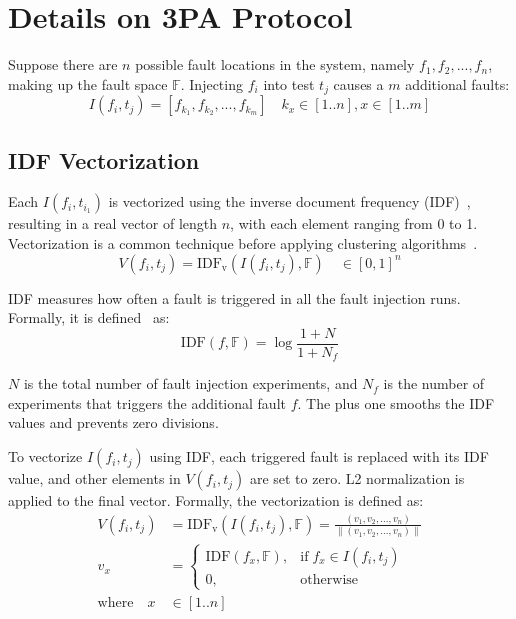 \appendix

\section{Details on 3PA Protocol}
\label{app:3pa}

Suppose there are $n$ possible fault locations in the system, namely $f_1, f_2, ..., f_n$, making up the fault space $\mathbb F$. Injecting $f_i$ into test $t_j$ causes a $m$ additional faults: 
\begin{equation} 
I(f_i, t_j)=[f_{{k_1}}, f_{{k_2}}, ..., f_{{k_m}}]\quad k_x\in[1..n], x \in [1..m]
\end{equation}

\subsection{IDF Vectorization}
\label{app:3pa:idf}

Each $I(f_i, t_{i_1})$ is vectorized using the inverse document frequency (IDF)~\cite{schutze2008introduction}, resulting in a real vector of length $n$, with each element ranging from 0 to 1. Vectorization is a common technique before applying clustering algorithms~\cite{schutze2008introduction}.
\begin{equation}
V(f_i, t_j)=\mathrm{IDF_v}(I(f_i, t_j), \mathbb{F}) \quad \in [0,1]^n
\end{equation}

IDF measures how often a fault is triggered in all the fault injection runs. Formally, it is defined~\cite{schutze2008introduction} as:
\begin{equation}
\mathrm{IDF}(f, \mathbb F) = \log \frac{1 + N}{1 + N_f}
\end{equation}

$N$ is the total number of fault injection experiments, and $N_f$ is the number of experiments that triggers the additional fault $f$. The plus one smooths the IDF values and prevents zero divisions.

To vectorize $I(f_i, t_j)$ using IDF, each triggered fault is replaced with its IDF value, and other elements in $V(f_i, t_j)$ are set to zero. L2 normalization is applied to the final vector. Formally, the vectorization is defined as:
\begin{equation}
\begin{aligned}
V(f_i, t_j) &= \mathrm{IDF_v}(I(f_i, t_j), \mathbb{F}) = \frac{(v_1, v_2, ..., v_n)}{\lVert (v_1, v_2, ..., v_n) \rVert} \\
v_{x} &= 
\begin{cases}
    \mathrm{IDF}(f_x, \mathbb F), & \mathrm{if} \; f_x \in I(f_i, t_j) \\
    0,                            & \mathrm{otherwise}
\end{cases} \\
\mathrm{where} \quad x &\in [1..n]
\end{aligned}
\end{equation}

